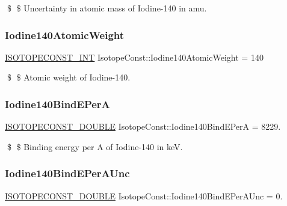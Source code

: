 \$ \$ Uncertainty in atomic mass of Iodine-\/140 in amu. \mbox{\label{group___isotope_const-_iodine-_i140_gada367d16a54466f7d3eabaf792f9b4da}} 
\subsubsection{\texorpdfstring{Iodine140\+Atomic\+Weight}{Iodine140AtomicWeight}}
{\footnotesize\ttfamily \mbox{\hyperlink{group___isotope_const-_macros_ga5f18360b3e99483a35c32d789e62621c}{I\+S\+O\+T\+O\+P\+E\+C\+O\+N\+S\+T\+\_\+\+I\+NT}} Isotope\+Const\+::\+Iodine140\+Atomic\+Weight = 140}

\$ \$ Atomic weight of Iodine-\/140. \mbox{\label{group___isotope_const-_iodine-_i140_gac7b5c78ef2fec5e5591351bac63a95e4}} 
\subsubsection{\texorpdfstring{Iodine140\+Bind\+E\+PerA}{Iodine140BindEPerA}}
{\footnotesize\ttfamily \mbox{\hyperlink{group___isotope_const-_macros_ga8f45a7272ce02c0b4c65c44636ed719a}{I\+S\+O\+T\+O\+P\+E\+C\+O\+N\+S\+T\+\_\+\+D\+O\+U\+B\+LE}} Isotope\+Const\+::\+Iodine140\+Bind\+E\+PerA = 8229.}

\$ \$ Binding energy per A of Iodine-\/140 in keV. \mbox{\label{group___isotope_const-_iodine-_i140_ga538bdee1c1a1600aa739279b5904a03d}} 
\subsubsection{\texorpdfstring{Iodine140\+Bind\+E\+Per\+A\+Unc}{Iodine140BindEPerAUnc}}
{\footnotesize\ttfamily \mbox{\hyperlink{group___isotope_const-_macros_ga8f45a7272ce02c0b4c65c44636ed719a}{I\+S\+O\+T\+O\+P\+E\+C\+O\+N\+S\+T\+\_\+\+D\+O\+U\+B\+LE}} Isotope\+Const\+::\+Iodine140\+Bind\+E\+Per\+A\+Unc = 0.}

